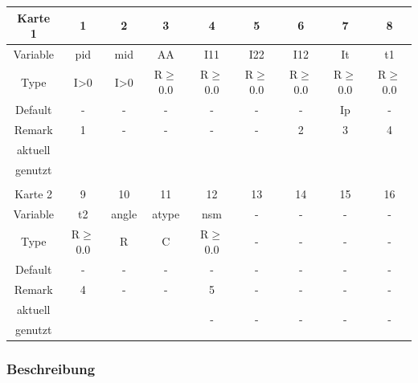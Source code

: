 \documentclass[11pt,titlepage,listof=totoc,bibliography=totoc,twoside]{scrreprt}
\begin{document}
{{\begin{table}[htbp]
\centering
\begin{tabularx}{\textwidth}{cCCCCCCCC}
\toprule
Karte 1	& 1		& 2		& 3		& 4		& 5		& 6		& 7		& 8		\\
\midrule
Variable& pid		& mid		& AA		& I11		& I22		& I12		& It		& t1		\\
Type	& I>0		& I>0		& R$\ge$0.0	& R$\ge$0.0	& R$\ge$0.0	& R$\ge$0.0	& R$\ge$0.0	& R$\ge$0.0	\\
Default	& -		& -		& -		& -		& -		& -		& Ip		& -		\\
Remark	& 1		& -		& -		& -		& -		& 2		& 3		& 4		\\
aktuell	& 	& 	& 	& 	& 	& 	& 	& 	\\
genutzt \\
\\
Karte 2	& 9		& 10		& 11		& 12		& 13		& 14		& 15		& 16		\\
\midrule
Variable& t2		& angle		& atype		& nsm		& -			& -			& -			& -			\\
Type	& R$\ge$0.0	& R		& C		& R$\ge$0.0	& -			& -			& -			& -			\\
Default	& -		& -		& -		& -		& -			& -			& -			& -			\\
Remark	& 4		& -		& -		& 5		& -			& -			& -			& -			\\
aktuell	& 	& 	& 	& 	& 	& \multirow{2}{*}{-}	& 	& 	\\
genutzt \\
\bottomrule
\end{tabularx}
\end{table}

\subsubsection{Beschreibung}

}}
\end{document}
